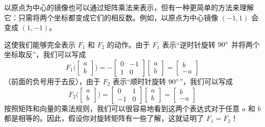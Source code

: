 \begin{example}
    以原点为中心的镜像也可以通过矩阵乘法来表示，但有一种更简单的方法来理解它：只需将两个坐标都变成它们的相反数。例如，以原点为中心镜像 $(-1, 1)$ 会变成 $(1, -1)$。

    这使我们能够完全表示 $F_1$ 和 $F_2$ 的动作。由于 $F_1$ 表示``逆时针旋转 $90 ^\circ$ 并将两个坐标取反''，我们可以写成
    \[F_1\Bigg(\begin{bmatrix}
        a \\
        b
     \end{bmatrix}\Bigg) = -\begin{bmatrix}
        0 & -1 \\
        1 & 0
     \end{bmatrix}\begin{bmatrix}
        a \\
        b
     \end{bmatrix}=\begin{bmatrix}
        b \\
        -a
     \end{bmatrix}\]
     （前面的负号用于去反），由于 $F_2$ 表示``顺时针旋转 $90 ^\circ$''，我们可以写成
     \[F_2\Bigg(\begin{bmatrix}
        a \\
        b
     \end{bmatrix}\Bigg) = \begin{bmatrix}
        0 & 1 \\
        -1 & 0
     \end{bmatrix}\begin{bmatrix}
        a \\
        b
     \end{bmatrix}=\begin{bmatrix}
        b \\
        -a
     \end{bmatrix}\]
     按照矩阵和向量的乘法规则，我们可以很容易地看到这两个表达式对于任意 $a$ 和 $b$ 都是相等的。因此，假设你对旋转矩阵有一些了解，这就证明了 $F_1 = F_2$！
\end{example}
